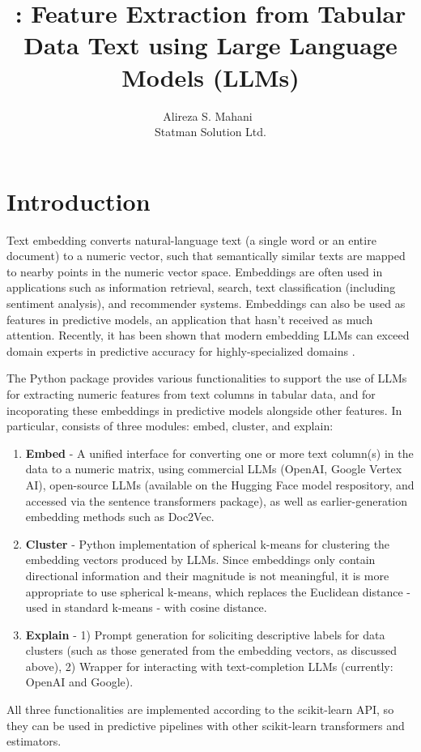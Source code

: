 \documentclass[article]{jss}
\author{Alireza S. Mahani~\orcidlink{0000-0002-7932-6681}\\Statman Solution Ltd.}
\title{\pkg{TabuLLM}: Feature Extraction from Tabular Data Text using Large Language Models (LLMs)}
\begin{document}
\section[Introduction]{Introduction} \label{sec:intro}

Text embedding converts natural-language text (a single word or an entire document) to a numeric vector, such that semantically similar texts are mapped to nearby points in the numeric vector space. Embeddings are often used in applications such as information retrieval, search, text classification (including sentiment analysis), and recommender systems. Embeddings can also be used as features in predictive models, an application that hasn't received as much attention. Recently, it has been shown that modern embedding LLMs can exceed domain experts in predictive accuracy for highly-specialized domains \citep{sharabiani2024genai}. 

The  Python package provides various functionalities to support the use of LLMs for extracting numeric features from text columns in tabular data, and for incoporating these embeddings in predictive models alongside other features. In particular,  consists of three modules: embed, cluster, and explain:
\begin{enumerate}
  \item \textbf{Embed} - A unified interface for converting one or more text column(s) in the data to a numeric matrix, using commercial LLMs (OpenAI, Google Vertex AI), open-source LLMs (available on the Hugging Face model respository, and accessed via the sentence transformers package), as well as earlier-generation embedding methods such as Doc2Vec.
  \item \textbf{Cluster} - Python implementation of spherical k-means for clustering the embedding vectors produced by LLMs. Since embeddings only contain directional information and their magnitude is not meaningful, it is more appropriate to use spherical k-means, which replaces the Euclidean distance - used in standard k-means - with cosine distance.
  \item \textbf{Explain} - 1) Prompt generation for soliciting descriptive labels for data clusters (such as those generated from the embedding vectors, as discussed above), 2) Wrapper for interacting with text-completion LLMs (currently: OpenAI and Google).
\end{enumerate}
All three functionalities are implemented according to the scikit-learn API, so they can be used in predictive pipelines with other scikit-learn transformers and estimators.
\end{document}
